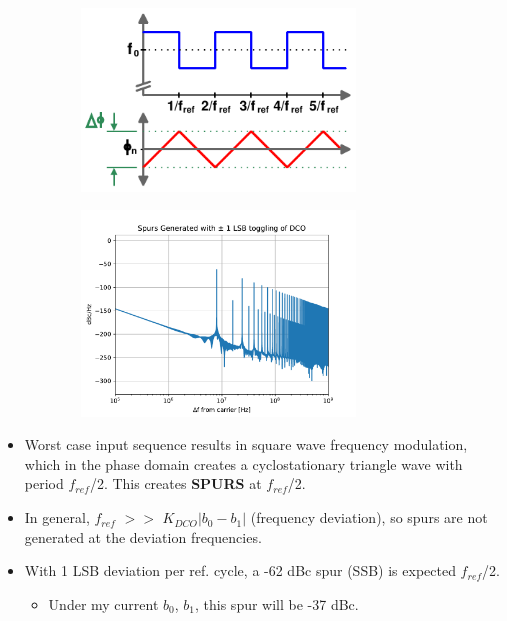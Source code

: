 	\begin{figure}[htb!]
	    \centering
	    \begin{subfigure}{0.5\textwidth}
	        \centering
	        \includegraphics[width=0.8\textwidth, angle=0]{./figs/bbpd_resolution_phase_walk}
	    \end{subfigure}%
	    \begin{subfigure}{0.5\textwidth}
	        \centering
	        \center\includegraphics[width=0.8\textwidth, angle=0]{./figs/spurs_dco}
	    \end{subfigure}
	\end{figure}
		\begin{itemize}[itemsep=4pt,label=\protect---]

			\item Worst case input sequence results in square wave frequency modulation, which in the phase domain creates a cyclostationary triangle wave with period $f_{ref}$/2. This creates \textbf{SPURS} at $f_{ref}$/2.
			\item In general, $f_{ref}$ $>>$ $K_{DCO}|b_0-b_1|$ (frequency deviation), so spurs are not generated at the deviation frequencies.
			\item With 1 LSB deviation per ref. cycle, a -62 dBc spur (SSB) is expected $f_{ref}$/2.
			\begin{itemize}[itemsep=4pt,label=\protect$\bullet$]
			\item Under my current $b_0$, $b_1$, this spur will be -37 dBc.
		\end{itemize}
		\end{itemize}



